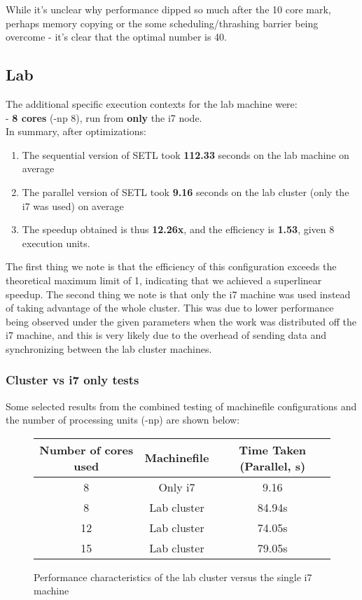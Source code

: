 \documentclass[12pt,a4paper]{article}
\begin{document}
While it's unclear why performance dipped so much after the 10 core mark, perhaps memory copying or the some scheduling/thrashing barrier being overcome - it's clear that the optimal number is 40. 

\newpage

\subsection{Lab}
The additional specific execution contexts for the lab machine were: \\

- \textbf{8 cores} (-np 8), run from \textbf{only} the i7 node. \\

In summary, after optimizations: 
\begin{enumerate} 
\item{The sequential version of SETL took \textbf{112.33} seconds on the lab machine on average}
\item{The parallel version of SETL took \textbf{9.16} seconds on the lab cluster (only the i7 was used) on average}
\item{The speedup obtained is thus \textbf{12.26x}, and the efficiency is \textbf{1.53}, given 8 execution units. }
\end{enumerate}

The first thing we note is that the efficiency of this configuration exceeds the theoretical maximum limit of 1, indicating that we achieved a superlinear speedup. The second thing we note is that only the i7 machine was used instead of taking advantage of the whole cluster. This was due to lower performance being observed under the given parameters when the work was distributed off the i7 machine, and this is very likely due to the overhead of sending data and synchronizing between the lab cluster machines. 

\subsubsection{Cluster vs i7 only tests}

Some selected results from the combined testing of machinefile configurations and the number of processing units (-np) are shown below: \\

\begin{figure}[h]
\begin{center}
\begin{tabular}{ |c|c|c| } 
 \hline
 Number of cores used & Machinefile & Time Taken (Parallel, s) \\
 \hline
 8 & Only i7 & 9.16 \\
 8 & Lab cluster & 84.94s \\
 12 & Lab cluster & 74.05s  \\
 15 & Lab cluster & 79.05s  \\
 \hline
\end{tabular}
\end{center}
\caption{Performance characteristics of the lab cluster versus the single i7 machine}
\end{figure}
\end{document}
